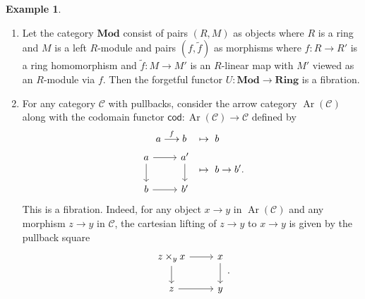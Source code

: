 \documentclass[10pt,letterpaper,cm]{nupset}
\theoremstyle{definition}
\newtheorem{exmp}[definition]{Example}
\theoremstyle{theorem}
\theoremstyle{remark}
\newcommand{\1}{\mathbf{1}}
\renewcommand{\c}{\mathscr{C}}
\newcommand{\0}{\vec 0}
\DeclareMathOperator{\ar}{Ar}
\begin{document}
\begin{exmp} $ $
\begin{enumerate}
\item Let the category $\mathbf{Mod}$ consist of pairs $\left(R, M\right)$ as objects where  $R$ is a ring and $M$ is a left $R$-module and pairs $\left(f, \tilde{f}\right)$ as morphisms where $f: R \to R'$ is a ring homomorphism and $\tilde{f}: M \to M'$ is an $R$-linear map with $M'$ viewed as an $R$-module via $f$. Then the forgetful functor $U: \mathbf{Mod} \to \mathbf{Ring}$ is a fibration.
\item For any category $\c$ with pullbacks, consider the arrow category $\ar(\c)$ along with the codomain functor $\mathsf{cod} : \ar(\c) \to \c$ defined by 
\begin{align*}
a \overset{f}{\longrightarrow} b \quad & \mapsto \ b
\\
\begin{tikzcd}[ampersand replacement=\&]
a \arrow[r] \arrow[d] \& a' \arrow[d] \\
b \arrow[r]           \& b'          
\end{tikzcd} \ & \mapsto \ b\to b'.
\end{align*}
This is a fibration. Indeed, for any object $x\to y$ in $\ar(\c)$ and any morphism $z\to y$ in $\c$, the cartesian lifting of $z\to y$ to $x\to y$ is given by the pullback square
\[
\begin{tikzcd}
z\times_y x \arrow[d] \arrow[r] & x \arrow[d] \\
z \arrow[r]                     & y          
\end{tikzcd}
.\]
\end{enumerate}
\end{exmp}
\end{document}
